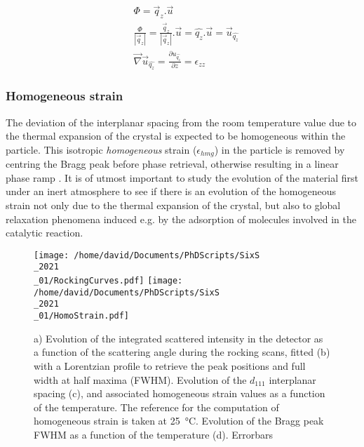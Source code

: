 \begin{align}
    \label{eq:StrainFromPhase1}
    & \Phi =  \vec{q}_z.\vec{u} \\
    \label{eq:StrainFromPhase2}
    & \frac{\Phi}{|\vec{q}_z|} = \frac{\vec{q}_z}{|\vec{q}_z|}.\vec{u} = \hat{q_z}.\vec{u} = \vec{u}_{\hat{q_z}} \\
    \label{eq:StrainFromPhase3}
    & \vec{\nabla} \vec{u}_{\hat{q_z}} = \frac{\partial u_{\hat{q_z}}}{\partial z} = \epsilon_{zz}
\end{align}

\subsubsection{Homogeneous strain}

The deviation of the interplanar spacing from the room temperature value due to the thermal expansion of the crystal is expected to be homogeneous within the particle.
This isotropic \textit{homogeneous} strain ($\epsilon_{hmg}$) in the particle is removed by centring the Bragg peak before phase retrieval, otherwise resulting in a linear phase ramp \parencite{}.
It is of utmost important to study the evolution of the material first under an inert atmosphere to see if there is an evolution of the homogeneous strain not only due to the thermal expansion of the crystal, but also to global relaxation phenomena induced e.g. by the adsorption of molecules involved in the catalytic reaction.


\begin{figure}[!htb]
    \centering
    \texttt{[image: /home/david/Documents/PhDScripts/SixS\\\_2021\\\_01/RockingCurves.pdf]}
    \texttt{[image: /home/david/Documents/PhDScripts/SixS\\\_2021\\\_01/HomoStrain.pdf]}
    \caption{
        a) Evolution of the integrated scattered intensity in the detector as a function of the scattering angle during the rocking scans, fitted (b) with a Lorentzian profile to retrieve the peak positions and full width at half maxima (FWHM).
        Evolution of the $d_{111}$ interplanar spacing (c), and associated homogeneous strain values as a function of the temperature.
        The reference for the computation of homogeneous strain is taken at \qty{25}{\degreeCelsius}.
        Evolution of the Bragg peak FWHM as a function of the temperature (d).
        \textcolor{Important}{Errorbars}
    }
    \label{fig:HomoStrain}
\end{figure}

